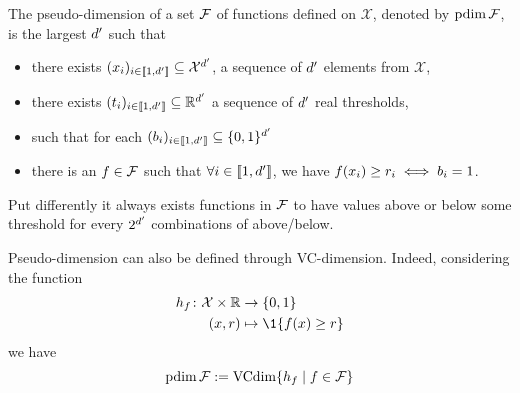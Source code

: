 \begin{tcolorbox}
	\begin{definition}
		The pseudo-dimension of a set $\mathcal{F}$ of functions defined on $\mathcal{X}$, denoted by $\operatorname{pdim}\mathcal{F}$, is the largest ${d^{\prime}}$ such that 
	\begin{itemize}
		\item there exists $(x_{i})_{i\in \llbracket 1,{d^{\prime}} \rrbracket} \subseteq \mathcal{X}^{d^{\prime}}$, a sequence of ${d^{\prime}}$ elements from $\mathcal{X}$,
		\item there exists $(t_i)_{i\in \llbracket 1,{d^{\prime}} \rrbracket} \subseteq  \mathbb{R}^{d^{\prime}}$ a sequence of ${d^{\prime}}$ real thresholds,
		\item such that for each $(b_i)_{i\in \llbracket 1,{d^{\prime}} \rrbracket} \subseteq \{0,1\}^{d^{\prime}}$
		\item there is an $f \in \mathcal{F}$ such that $\forall i \in \llbracket 1,{d^{\prime}} \rrbracket$, we have $f(x_i) \geq r_i \iff b_i = 1$. 
	\end{itemize}
	Put differently it always exists functions in $\mathcal{F}$ to have values above or below some threshold for every $2^{d^{\prime}}$ combinations of above/below.
\end{definition}
Pseudo-dimension can also be defined through VC-dimension. Indeed, considering the function
\begin{align*}
	h_\query \colon \mathcal{X} \times \RR &\to \{0,1\}\\
	(x,r) &\mapsto \1\{f(x) \geq r\}
\end{align*}
we have
\begin{equation}
	\operatorname{pdim}\mathcal{F} := \operatorname{VCdim}\{h_f \mid f \in \mathcal{F}\}
\end{equation}
\end{tcolorbox}








